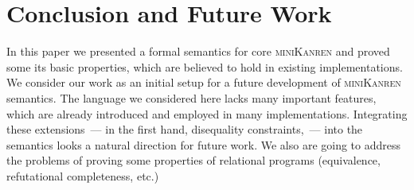 \section{Conclusion and Future Work}

In this paper we presented a formal semantics for core \textsc{miniKanren} and proved some its basic properties,
which are believed to hold in existing implementations. We consider our work as an initial setup for a future development
of \textsc{miniKanren} semantics. The language we considered here lacks many important features, which are already introduced
and employed in many implementations. Integrating these extensions~--- in the first hand, disequality constraints,~--- into
the semantics looks a natural direction for future work. We also are going to address the problems of proving some
properties of relational programs (equivalence, refutational completeness, etc.)


